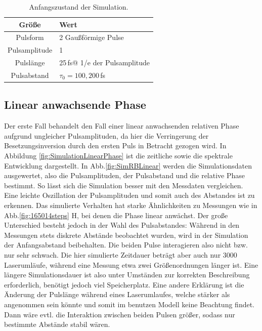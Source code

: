 \documentclass[bachelor,       %
               twoside,        %
               BCOR10mm,       %
               liststotoc,nomtotoc,bibtotoc, %
               english,ngerman, %
               final,          %
               ]{GAUBM}
\begin{document}
\begin{table}[!htb]
	\centering
	\begin{tabular}{|c|l|}
		\hline
		Größe & Wert\\
		\hline	
		Pulsform & 2 Gaußförmige Pulse\\
		Pulsamplitude & 1\\
		Pulslänge & 25\,fs\quad @ 1/e der Pulsamplitude\\
		Pulsabstand & $\tau_0=100,200\,$fs\\
		\hline
	\end{tabular}
	\caption{Anfangszustand der Simulation.}
	\label{tab:SimParamStart}
\end{table}


\clearpage
\subsection{Linear anwachsende Phase}
Der erste Fall behandelt den Fall einer linear anwachsenden relativen Phase aufgrund ungleicher Pulsamplituden, da hier die Verringerung der Besetzungsinversion durch den ersten Puls in Betracht gezogen wird.
In Abbildung \ref{fig:SimulationLinearPhase} ist die zeitliche sowie die spektrale Entwicklung dargestellt.
In Abb.\ref{fig:SimRBLinear} werden die Simulationsdaten ausgewertet, also die Pulsamplituden, der Pulsabstand und die relative Phase bestimmt.
So lässt sich die Simulation besser mit den Messdaten vergleichen.
Eine leichte Oszillation der Pulsamplituden und somit auch des Abstandes ist zu erkennen.
Das simulierte Verhalten hat starke Ähnlichkeiten zu Messungen wie in Abb.\ref{fig:165014steps} H, bei denen die Phase linear anwächst.
Der große Unterschied besteht jedoch in der Wahl des Pulsabstandes:
Während in den Messungen stets diskrete Abstände beobachtet wurden, wird in der Simulation der Anfangsabstand beibehalten.
Die beiden Pulse interagieren also nicht bzw. nur sehr schwach.
Die hier simulierte Zeitdauer beträgt aber auch nur 3000 Laserumläufe, während eine Messung etwa zwei Größenordnungen länger ist.
Eine längere Simulationsdauer ist also unter Umständen zur korrekten Beschreibung erforderlich, benötigt jedoch viel Speicherplatz.
Eine andere Erklärung ist die Änderung der Pulslänge während eines Laserumlaufes, welche stärker als angenommen sein könnte und somit im benutzen Modell keine Beachtung findet.
Dann wäre evtl. die Interaktion zwischen beiden Pulsen größer, sodass nur bestimmte Abstände stabil wären.
\end{document}
